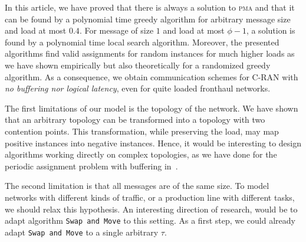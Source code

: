 \documentclass[a4paper,UKenglish,cleveref, autoref, thm-restate]{lipics-v2019}
\newcommand\pma{\textsc{pma}\xspace}
\newcommand\swapandmove{\texttt{Swap and Move}\xspace}
\begin{document}
In this article, we have proved that there is always a solution to \pma and that it can be found by a polynomial time greedy algorithm for arbitrary message size and load at most $0.4$. For message of size $1$ and load at most $\phi - 1$, a solution is found by a polynomial time local search algorithm. Moreover, the presented algorithms find valid assignments for random instances for much higher loads as we have shown empirically but also theoretically for a randomized greedy algorithm. As a consequence, we obtain communication schemes for C-RAN with \emph{no buffering nor logical latency}, even for quite loaded fronthaul networks.

The first limitations of our model is the topology of the network. We have shown that an arbitrary topology can be transformed into a topology with two contention points. This transformation, while preserving the load, may map positive instances into negative instances. Hence, it would be interesting to design algorithms working directly on complex topologies, as we have done for the periodic assignment problem with buffering in~\cite{guiraud2021deterministic}.

The second limitation is that all messages are of the same size. 
To model networks with different kinds of traffic, or a production line with different tasks, we should relax this hypothesis. 
An interesting direction of research, would be to adapt algorithm \swapandmove to this setting. As a first step, we could already adapt \swapandmove to a single arbitrary $\tau$.



\end{document}
